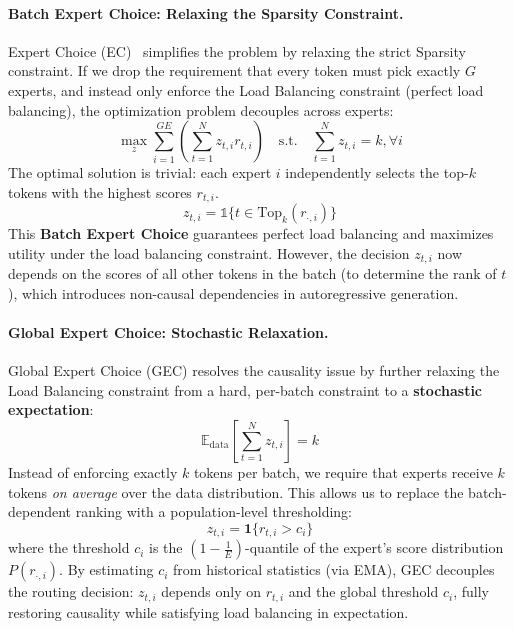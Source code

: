\documentclass{article}
\theoremstyle{plain}
\theoremstyle{definition}
\theoremstyle{remark}
\begin{document}
\paragraph{Batch Expert Choice: Relaxing the Sparsity Constraint.}
Expert Choice (EC)~\cite{zhou2022mixture} simplifies the problem by relaxing the strict Sparsity constraint. If we drop the requirement that every token must pick exactly $G$ experts, and instead only enforce the Load Balancing constraint (perfect load balancing), the optimization problem decouples across experts:
\begin{equation}
\label{eq:ec_relax}
\max_{z} \sum_{i=1}^{GE} \left( \sum_{t=1}^N z_{t,i} r_{t,i} \right) \quad \text{s.t.} \quad \sum_{t=1}^N z_{t,i} = k, \forall i
\end{equation}
The optimal solution is trivial: each expert $i$ independently selects the top-$k$ tokens with the highest scores $r_{t,i}$.
\begin{equation}
z_{t,i} = \mathbb{1}\{t \in \text{Top}_k(r_{\cdot, i})\}
\end{equation}
This \textbf{Batch Expert Choice} guarantees perfect load balancing and maximizes utility under the load balancing constraint. However, the decision $z_{t,i}$ now depends on the scores of all other tokens in the batch (to determine the rank of $t$), which introduces non-causal dependencies in autoregressive generation.

\paragraph{Global Expert Choice: Stochastic Relaxation.}
Global Expert Choice (GEC) resolves the causality issue by further relaxing the Load Balancing constraint from a hard, per-batch constraint to a \textbf{stochastic expectation}:
\begin{equation}
\mathbb{E}_{\text{data}} \left[ \sum_{t=1}^N z_{t,i} \right] = k
\end{equation}
Instead of enforcing exactly $k$ tokens per batch, we require that experts receive $k$ tokens \textit{on average} over the data distribution. This allows us to replace the batch-dependent ranking with a population-level thresholding:
\begin{equation}
z_{t,i} = \mathbf{1}\{r_{t,i} > c_i\}
\end{equation}
where the threshold $c_i$ is the $(1 - \frac{1}{E})$-quantile of the expert's score distribution $P(r_{\cdot, i})$. By estimating $c_i$ from historical statistics (via EMA), GEC decouples the routing decision: $z_{t,i}$ depends only on $r_{t,i}$ and the global threshold $c_i$, fully restoring causality while satisfying load balancing in expectation.
\end{document}
